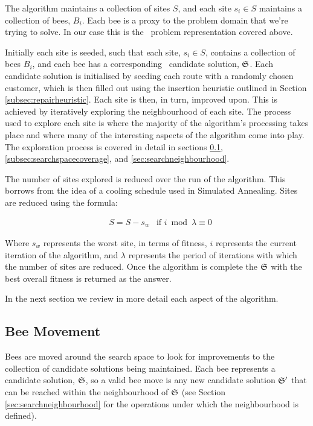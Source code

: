 The algorithm maintains a collection of sites $S$, and each site $s_i \in S$ maintains a collection of bees, $B_i$. Each bee is a proxy to the problem domain that we're trying to solve. In our case this is the \VRP\ problem representation covered above.

Initially each site is seeded, such that each site, $s_i \in S$, contains a collection of bees $B_i$, and each bee has a corresponding \VRP\ candidate solution, $\mathfrak{S}$. Each candidate solution is initialised by seeding each route with a randomly chosen customer, which is then filled out using the insertion heuristic outlined in Section \ref{subsec:repairheuristic}. Each site is then, in turn, improved upon. This is achieved by iteratively exploring the neighbourhood of each site. The process used to explore each site is where the majority of the algorithm's processing takes place and where many of the interesting aspects of the algorithm come into play. The exploration process is covered in detail in sections \ref{sec:beemovement}, \ref{subsec:searchspacecoverage}, and \ref{sec:searchneighbourhood}.

The number of sites explored is reduced over the run of the algorithm. This borrows from the idea of a cooling schedule used in Simulated Annealing. Sites are reduced using the formula:

\begin{align}
   & S = S - s_w & \text{if $i \bmod{\lambda} \equiv 0$}
\end{align}

Where $s_w$ represents the worst site, in terms of fitness, $i$ represents the current iteration of the algorithm, and $\lambda$ represents the period of iterations with which the number of sites are reduced. Once the algorithm is complete the $\mathfrak{S}$ with the best overall fitness is returned as the answer.

In the next section we review in more detail each aspect of the algorithm. 

\subsection{Bee Movement}
\label{sec:beemovement}

Bees are moved around the search space to look for improvements to the collection of candidate solutions being maintained. Each bee represents a candidate solution, $\mathfrak{S}$, so a valid bee move is any new candidate solution $\mathfrak{S}'$ that can be reached within the neighbourhood of $\mathfrak{S}$ (see Section \ref{sec:searchneighbourhood} for the operations under which the neighbourhood is defined).

